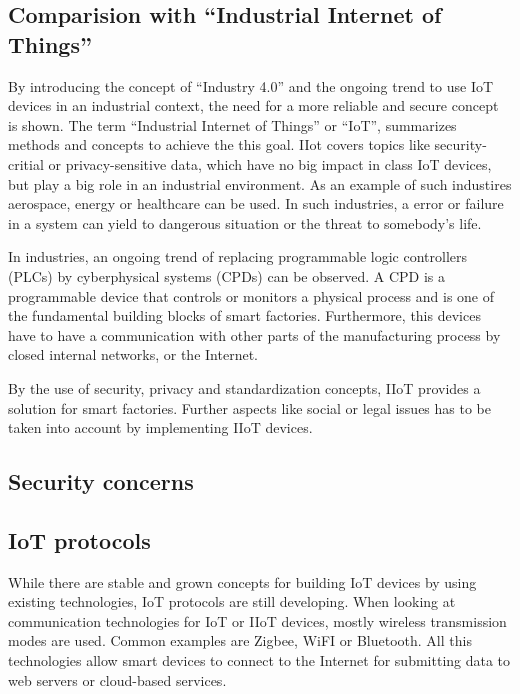 \subsection{Comparision with ``Industrial Internet of Things''}
By introducing the concept of ``Industry 4.0'' and the ongoing trend to use IoT devices in an industrial context, the need for a more reliable and secure concept is shown. The term ``Industrial Internet of Things'' or ``IoT'', summarizes methods and concepts to achieve the this goal. IIot covers topics like security-critial or privacy-sensitive data, which have no big impact in class IoT devices, but play a big role in an industrial environment\cite{iiot}. As an example of such industires aerospace, energy or healthcare can be used. In such industries, a error or failure in a system can yield to dangerous situation or the threat to somebody's life\cite{iiot2}.

In industries, an ongoing trend of replacing programmable logic controllers (PLCs) by cyberphysical systems (CPDs) can be observed. A CPD is a programmable device that controls or monitors a physical process and is one of the fundamental building blocks of smart factories. Furthermore, this devices have to have a communication with other parts of the manufacturing process by closed internal networks, or the Internet\cite{iiot}.

By the use of security, privacy and standardization concepts, IIoT provides a solution for smart factories. Further aspects like social or legal issues has to be taken into account by implementing IIoT devices\cite{iiot}.

\subsection{Security concerns}

\subsection{IoT protocols}
While there are stable and grown concepts for building IoT devices by using existing technologies, IoT protocols are still developing. When looking at communication technologies for IoT or IIoT devices, mostly wireless transmission modes are used. Common examples are Zigbee, WiFI or Bluetooth. All this technologies allow smart devices to connect to the Internet for submitting data to web servers or cloud-based services\cite{iotprotocols}.

